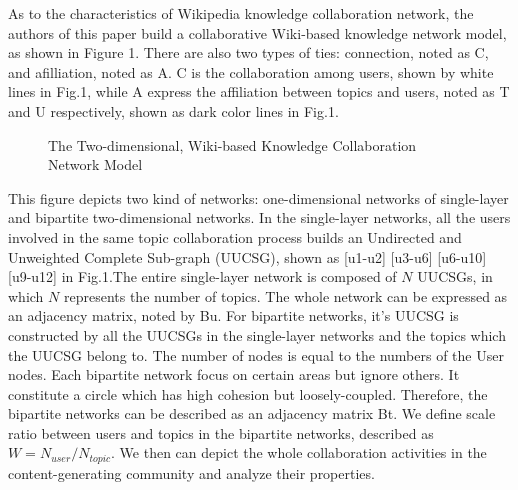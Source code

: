 \documentclass{elsarticle}
\begin{document}
As to the characteristics of Wikipedia knowledge collaboration
network, the authors of this paper build a collaborative Wiki-based
knowledge network model, as shown in Figure 1. There are also two
types of ties: connection, noted as C, and afilliation, noted as A. C
is the collaboration among users, shown by white lines in Fig.1, while
A express the affiliation between topics and users, noted as T and U respectively, shown as dark color lines in Fig.1. 

\begin{figure}[h]
  \centering
  \scalebox{0.8}{\texttt{[image: 01]}}
  \caption{The Two-dimensional, Wiki-based Knowledge Collaboration Network Model}
\end{figure}

This figure depicts  two kind of  networks: one-dimensional networks of
single-layer and bipartite two-dimensional networks. 
In the single-layer networks, all the users involved in the same topic
collaboration process builds an Undirected and Unweighted Complete
Sub-graph (UUCSG), shown as [u1-u2] [u3-u6] [u6-u10] [u9-u12] in
Fig.1.The entire single-layer network is composed of $N$ UUCSGs, in
which $N$ represents the number of topics. The whole network can be
expressed as an adjacency matrix, noted by Bu.
For bipartite networks, it's UUCSG is constructed by all the UUCSGs in
 the single-layer networks and the topics which the UUCSG belong
 to. The number of nodes is equal to the numbers of the User
 nodes. Each bipartite network focus on  certain areas but ignore
 others. It  constitute a circle which has high
 cohesion but loosely-coupled. Therefore, the bipartite networks can be described as an
 adjacency matrix Bt. We define scale ratio  between users and topics  in
 the bipartite networks,
 described as
 \begin{math}
 W = N_{user}/N_{topic}   
 \end{math}.
We then can depict the whole collaboration activities in the
content-generating community and analyze their properties.

\end{document}
